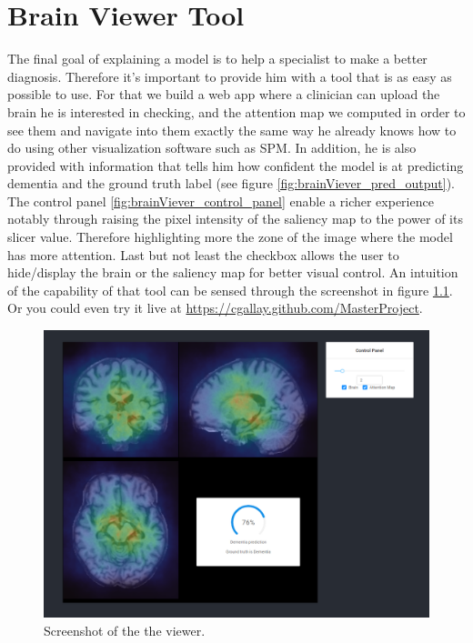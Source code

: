 \chapter{Brain Viewer Tool}
\label{chap:brainviewer}
The final goal of explaining a model is to help a specialist to make a better diagnosis. Therefore it's important to provide him with a tool that is as easy as possible to use. For that we build a web app where a clinician can upload the brain he is interested in checking, and the attention map we computed in order to see them and navigate into them exactly the same way he already knows how to do using other visualization software such as SPM\footnotemark{}. In addition, he is also provided with information that tells him how confident the model is at predicting dementia and the ground truth label (see figure \ref{fig:brainViever_pred_output}). The control panel \ref{fig:brainViever_control_panel} enable a richer experience notably through raising the pixel intensity of the saliency map to the power of its slicer value. Therefore highlighting more the zone of the image where the model has more attention. Last but not least the checkbox allows the user to hide/display the brain or the saliency map for better visual control. An intuition of the capability of that tool can be sensed through the screenshot in figure \ref{fig:brain_viewer}. Or you could even try it live at \href{https://cgallay.github.com/MasterProject}{https://cgallay.github.com/MasterProject}.

\begin{figure}
 \centering
 \includegraphics[width=.9\linewidth]{figures/BrainViewer/main.png}
 \captionsetup{width=.9\linewidth}
 \caption{Screenshot of the the viewer.}
 \label{fig:brain_viewer}
\end{figure}

